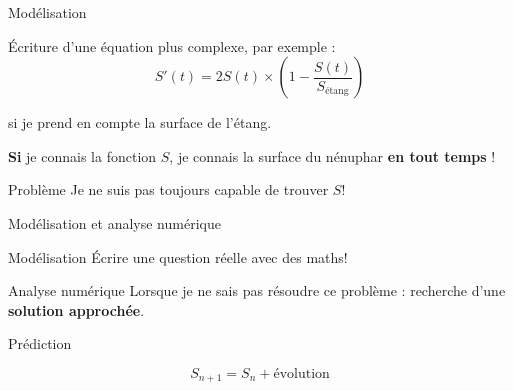 \documentclass[11pt]{beamer}
\begin{document}
\begin{frame}{Modélisation}

\'Ecriture d'une équation plus complexe, par exemple :
$$
S'(t) = 2 S(t) \times \left( 1 - \dfrac{S(t)}{S_{\text{étang}}} \right)
$$

si je prend en compte la surface de l'étang.

\vspace{1cm}
\pause

\textbf{Si} je connais la fonction $S$, je connais la surface du nénuphar \textbf{en tout temps} !

\pause
\begin{block}{Problème}
Je ne suis pas toujours capable de trouver $S$!
\end{block}

\end{frame}


\begin{frame}{Modélisation et analyse numérique}

\begin{block}{Modélisation}
\'Ecrire une question réelle avec des maths!
\end{block}

\vspace{1cm}
\pause

\begin{block}{Analyse numérique}
Lorsque je ne sais pas résoudre ce problème : recherche d'une \textbf{solution approchée}.
\end{block}

\end{frame}


\begin{frame}{Prédiction}

$$S_{n+1}= S_n + \text{évolution}$$

\begin{center}
\end{center}
\end{frame}
\end{document}
